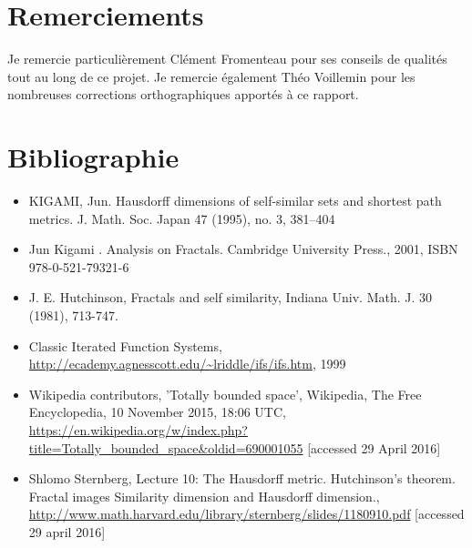 \documentclass[a4paper, 12pt]{report}
\begin{document}
	\chapter*{Remerciements}
	
	Je remercie particulièrement Clément Fromenteau pour ses conseils de qualités tout au long de ce projet.
	\newline
	Je remercie également Théo Voillemin pour les nombreuses corrections orthographiques apportés à ce rapport.
	
	\chapter*{Bibliographie}
		\begin{itemize}
			\setlength\itemsep{.5 cm}
			\item KIGAMI, Jun. Hausdorff dimensions of self-similar sets and shortest path metrics. J. Math. Soc. Japan 47 (1995), no. 3, 381--404
			
			\item Jun Kigami . Analysis on Fractals. Cambridge University Press., 2001, ISBN 978-0-521-79321-6
			
			\item J. E. Hutchinson, Fractals and self similarity, Indiana Univ. Math. J. 30 (1981), 713-747.

			\item Classic Iterated Function Systems, \url{http://ecademy.agnesscott.edu/~lriddle/ifs/ifs.htm}, 1999

			\item Wikipedia contributors, 'Totally bounded space', Wikipedia, The Free Encyclopedia, 10 November 2015, 18:06 UTC, \url{https://en.wikipedia.org/w/index.php?title=Totally_bounded_space&oldid=690001055} [accessed 29 April 2016]
			
			\item Shlomo Sternberg, Lecture 10: The Hausdorff metric. Hutchinson's theorem. Fractal images Similarity dimension and Hausdorff dimension., \url{http://www.math.harvard.edu/library/sternberg/slides/1180910.pdf} [accessed 29 april 2016]
		\end{itemize}
\end{document}
